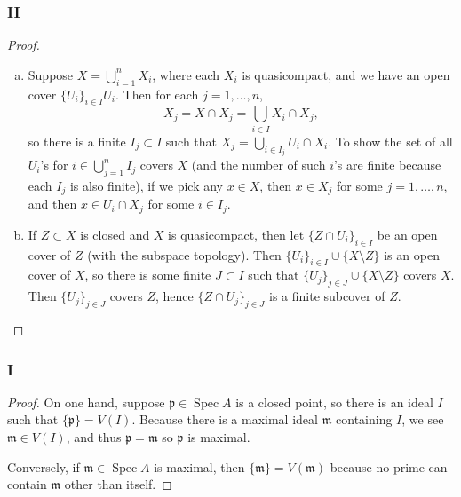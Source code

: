 \documentclass{article}
\newcommand{\frkm}{\mathfrak{m}}
\newcommand{\frkp}{\mathfrak{p}}
\DeclareMathOperator{\Spec}{\mathrm{Spec}}
\theoremstyle{definition} %
\begin{document}
\subsubsection{H}\label{3.6.H}
\begin{proof}
    \begin{enumerate}[(a)]
        \item Suppose $X=\bigcup_{i=1}^n X_i$, where each $X_i$ is quasicompact, and we have an open cover $\{U_i\}_{i\in I} U_i$. Then for each $j=1,\dots, n$,
        \[
        X_j= X\cap X_j = \bigcup_{i\in I} X_i \cap X_j,
        \]
        so there is a finite $I_j\subset I$ such that $X_j=\bigcup_{i\in I_j} U_i \cap X_i$. To show the set of all $U_i$'s for $i \in \bigcup_{j=1}^n I_j$ covers $X$ (and the number of such $i$'s are finite because each $I_j$ is also finite), if we pick any $x\in X$, then $x\in X_j$ for some $j=1,\dots,n$, and then $x\in U_i\cap X_j$ for some $i\in I_j$.
        \item If $Z\subset X$ is closed and $X$ is quasicompact, then let $\{Z\cap U_i\}_{i\in I}$ be an open cover of $Z$ (with the subspace topology). Then $\{U_i\}_{i\in I} \cup \{X\setminus Z\}$ is an open cover of $X$, so there is some finite $J\subset I$ such that $\{U_j\}_{j\in J} \cup \{X\setminus Z\}$ covers $X$. Then $\{U_j\}_{j\in J}$ covers $Z$, hence $\{Z\cap U_j\}_{j\in J}$ is a finite subcover of $Z$.
    \end{enumerate}
\end{proof}
\subsubsection{I}\label{3.6.I}
\begin{proof}
    On one hand, suppose $\frkp\in \Spec A$ is a closed point, so there is an ideal $I$ such that $\{\frkp\} = V(I)$. Because there is a maximal ideal $\frkm$ containing $I$, we see $\frkm\in V(I)$, and thus $\frkp=\frkm$ so $\frkp$ is maximal.

    Conversely, if $\frkm\in \Spec A$ is maximal, then $\{\frkm\}=V(\frkm)$ because no prime can contain $\frkm$ other than itself.
\end{proof}
\end{document}
